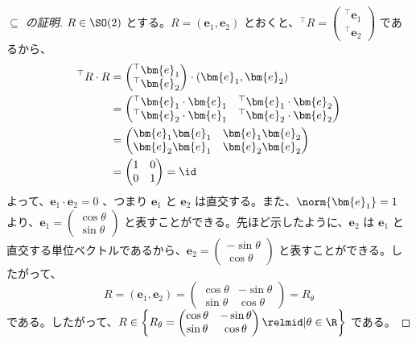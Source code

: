 \documentclass[article,paper=a4paper]{jlreq}
\begin{document}
\begin{proof}[$\subseteq$ の証明]
    $R \in \SO(2)$ とする。$R = (\bm{e}_1, \bm{e}_2)$ とおくと、${}^\top R = \begin{pmatrix}
        {}^\top \bm{e}_1\\
        {}^\top \bm{e}_2
    \end{pmatrix}$ であるから、
    \begin{align*}
        {}^\top R \cdot R &= \begin{pmatrix}
        {}^\top \bm{e}_1\\
        {}^\top \bm{e}_2
    \end{pmatrix} \cdot (\bm{e}_1, \bm{e}_2) \\
    &= \begin{pmatrix}
        {}^\top \bm{e}_1 \cdot \bm{e}_1 & {}^\top \bm{e}_1 \cdot \bm{e}_2\\
        {}^\top \bm{e}_2 \cdot \bm{e}_1 & {}^\top \bm{e}_2 \cdot \bm{e}_2
    \end{pmatrix}\\
    &= \begin{pmatrix}
        \bm{e}_1\bm{e}_1 & \bm{e}_1\bm{e}_2\\
        \bm{e}_2\bm{e}_1 & \bm{e}_2\bm{e}_2
    \end{pmatrix} \\
    &= \begin{pmatrix}
        1 & 0\\
        0 & 1
    \end{pmatrix} = \id
    \end{align*}
    よって、$\bm{e}_1 \cdot \bm{e}_2 = 0$ 、つまり $\bm{e}_1$ と $\bm{e}_2$ は直交する。また、$\norm{\bm{e}_1} = 1$ より、$\bm{e}_1 = \begin{pmatrix} \cos\theta \\ \sin\theta \end{pmatrix}$ と表すことができる。先ほど示したように、$\bm{e}_2$ は $\bm{e}_1$ と直交する単位ベクトルであるから、$\bm{e}_2 = \begin{pmatrix} -\sin\theta \\ \cos\theta \end{pmatrix}$ と表すことができる。したがって、
\[R = (\bm{e}_1, \bm{e}_2) = \begin{pmatrix}
        \cos\theta & -\sin\theta\\
        \sin\theta & \cos\theta
    \end{pmatrix} = R_\theta\]
である。したがって、$R \in \left\{R_\theta = \begin{pmatrix}
        \cos\theta & -\sin\theta\\
        \sin\theta & \cos\theta
    \end{pmatrix} \relmid | \theta \in \R\right\}$ である。
    
\end{proof}
\end{document}
